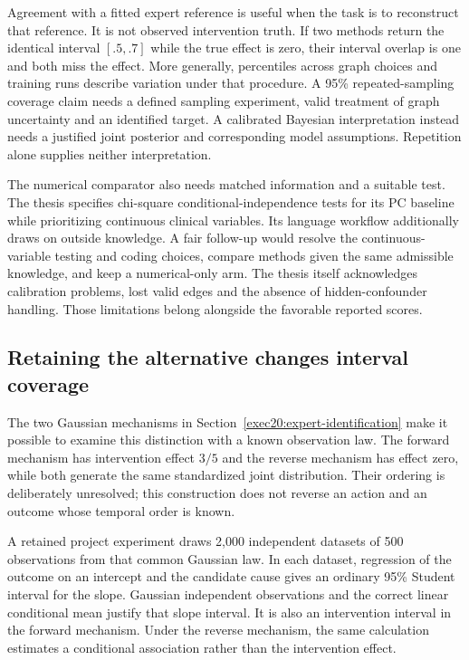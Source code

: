 Agreement with a fitted expert reference is useful when the task is to
reconstruct that reference. It is not observed intervention truth. If two
methods return the identical interval $[.5,.7]$ while the true effect is zero,
their interval overlap is one and both miss the effect. More generally,
percentiles across graph choices and training runs describe variation under
that procedure. A 95\% repeated-sampling coverage claim needs a defined
sampling experiment, valid treatment of graph uncertainty and an identified
target. A calibrated Bayesian interpretation instead needs a justified joint
posterior and corresponding model assumptions. Repetition alone supplies
neither interpretation.

The numerical comparator also needs matched information and a suitable test.
The thesis specifies chi-square conditional-independence tests for its PC
baseline while prioritizing continuous clinical variables. Its language
workflow additionally draws on outside knowledge. A fair follow-up would
resolve the continuous-variable testing and coding choices, compare methods
given the same admissible knowledge, and keep a numerical-only arm. The
thesis itself acknowledges calibration problems, lost valid edges and the
absence of hidden-confounder handling. Those limitations belong alongside
the favorable reported scores. \citep{rel64molero}

\subsection{Retaining the alternative changes interval coverage}

The two Gaussian mechanisms in Section~\ref{exec20:expert-identification}
make it possible to examine this distinction with a known observation law.
The forward mechanism has intervention effect $3/5$ and the reverse mechanism
has effect zero, while both generate the same standardized joint distribution.
Their ordering is deliberately unresolved; this construction does not reverse
an action and an outcome whose temporal order is known.

A retained project experiment draws 2,000 independent datasets of 500
observations from that common Gaussian law. In each dataset, regression of
the outcome on an intercept and the candidate cause gives an ordinary 95\%
Student interval for the slope. Gaussian independent observations and the
correct linear conditional mean justify that slope interval. It is also an
intervention interval in the forward mechanism. Under the reverse mechanism,
the same calculation estimates a conditional association rather than the
intervention effect.

